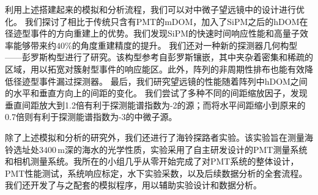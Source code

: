 \begin{cabstract}
利用上述搭建起来的模拟和分析流程，我们可以对中微子望远镜中的设计进行优化。
我们探讨了相比于传统只含有PMT的mDOM，加入了SiPM之后的hDOM在径迹型事件的方向重建上的优势。我们发现SiPM的快速时间响应性能和高量子效率能够带来约$40\%$的角度重建精度的提升。
我们还对一种新的探测器几何构型——彭罗斯构型进行了研究。该构型参考自彭罗斯镶嵌，其中夹杂着密集和稀疏的区域，用以拓宽对簇射型事件的响应能区。此外，阵列的非周期性排布也能有效降低径迹型事件漏过探测器。
最后，我们研究望远镜的性能随着阵列中hDOM之间的水平和垂直方向上的间距的变化。
我们尝试了多种不同的间距缩放因子，发现垂直间距放大到1.2倍有利于探测能谱指数为-2的源；而将水平间距缩小到原来的0.7倍则有利于探测能谱指数为-3的中微子源。

除了上述模拟和分析的研究外，我们还进行了海铃探路者实验。该实验旨在测量海铃选址处$3400\,\mathrm{m}$深的海水的光学性质，实验采用了自主研发设计的PMT测量系统和相机测量系统。我所在的小组几乎从零开始完成了对PMT系统的整体设计，PMT性能测试，系统响应标定，水下实验采数，以及后续数据分析的全套流程。我们还开发了与之配套的模拟程序，用以辅助实验设计和数据分析。



\end{cabstract}

